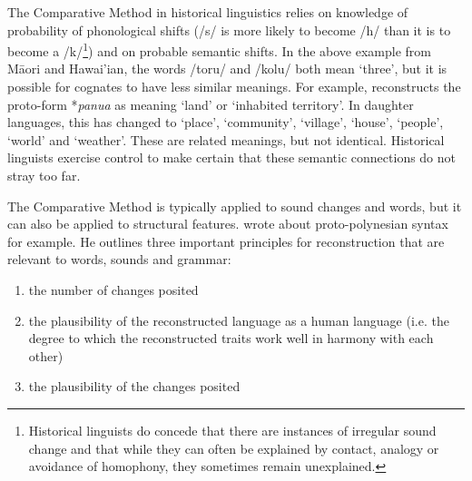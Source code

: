 \documentclass[a4paper,10pt]{article} %
\begin{document}
The Comparative Method in historical linguistics relies on knowledge of probability of phonological shifts (/s/ is more likely to become /h/ than it is to become a /k/\footnote{Historical linguists do concede that there are instances of irregular sound change \citep{blust1996neogrammarian, campbell1996sound} and that while they can often be explained by contact, analogy or avoidance of homophony, they sometimes remain unexplained.}) and on probable semantic shifts. In the above example from M\={a}ori and Hawai'ian, the words /toru/ and /kolu/ both mean `three', but it is possible for cognates to have less similar meanings. For example, \citet{pawley2005meaning} reconstructs the proto-form *\emph{panua} as meaning `land' or `inhabited territory'. In daughter languages, this has changed to `place', `community', `village', `house', `people', `world' and `weather'. These are related meanings, but not identical. Historical linguists exercise control to make certain that these semantic connections do not stray too far.



The Comparative Method is typically applied to sound changes and words, but it can also be applied to structural features. \citet[17-22]{clark1976aspects} wrote about proto-polynesian syntax for example. He outlines three important principles for reconstruction that are relevant to words, sounds and grammar:

\begin{enumerate}[label=(\roman*)]
\item the number of changes posited
\item the plausibility of the reconstructed language as a human language (i.e. the degree to which the reconstructed traits work well in harmony with each other)
\item the plausibility of the changes posited
\end{enumerate}
\end{document}
